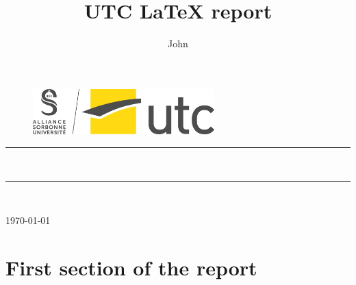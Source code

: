 \documentclass{utc-report}
\title{UTC LaTeX report}
\author{John \\\sc{DOE}}
\begin{document}
\thispagestyle{empty}
\setcounter{page}{0}

\begin{figure}[H]
\centering
\includegraphics[width=7cm]{utc_su_logo.png}
\end{figure}

\vspace{3cm}

\begin{center}

{\color{utcyellow}\rule{\linewidth}{0.8mm}}
\vspace*{0mm}

\Huge{\textbf{\theUV \\ \thetitle}}
{\color{utcyellow}\rule{\linewidth}{0.8mm}}

\vspace{0.5cm}
\Large{\theauthor} \\

\vspace{7cm}

\Large{\today}
\end{center}
 
\vspace{3cm}

\pagebreak

\tableofcontents{}

\pagebreak

\section{First section of the report}
\end{document}
